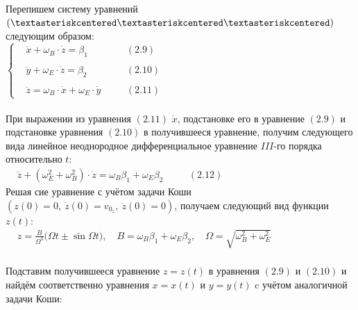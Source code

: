 \documentclass[oneside,final,14pt]{extarticle}
\begin{document}
	\noindent Перепишем систему уравнений $(\textasteriskcentered\textasteriskcentered\textasteriskcentered)$ следующим образом: \\
	
	\begin{math}
		\left\{
		\begin{aligned}
			& \ddot{x} + \omega_{B} \cdot \dot{z} = \beta_{1} \quad && (2.9) \\\\
			& \ddot{y} + \omega_{E} \cdot \dot{z} = \beta_{2} \quad && (2.10) \\\\
			& \ddot{z} = \omega_{B} \cdot \dot{x} + \omega_{E} \cdot \dot{y} \quad && (2.11)
		\end{aligned}
		\right.
	\end{math} \\\\
	
	\noindent При выражении из уравнения $(2.11)$ $\dot{x}$, подстановке его в уравнение $(2.9)$ и подстановке уравнения $(2.10)$ в получившееся уравнение, получим следующего вида линейное неоднородное дифференциальное уравнение $III$-го порядка относительно $t$: \\
	
	\begin{math}
		\begin{aligned}
			& \dddot{z} + (\omega_{E}^{2} + \omega_{B}^{2}) \cdot \dot{z} = \omega_{B}\beta_{1} + \omega_{E}\beta_{2} \quad && (2.12)
		\end{aligned}
	\end{math} \\
	
	\noindent Решая сие уравнение с учётом задачи Коши $(z(0) = 0,\ \dot{z}(0) = v_{0_{z}},\ \ddot{z}(0) = 0)$, получаем следующий вид функции $z(t)$: \\
	
	\begin{math}
		\begin{aligned}
			& z = \frac{B}{\Omega^{3}} \Big(\Omega t \pm \sin{\Omega t}\Big), \quad B = \omega_{B}\beta_{1} + \omega_{E}\beta_{2}, \quad \Omega = \sqrt{\omega_{B}^{2} + \omega_{E}^{2}} 
		\end{aligned}
	\end{math} \\\\
	
	\noindent Подставим получившееся уравнение $z = z(t)$ в уравнения $(2.9)$ и $(2.10)$ и найдём соответственно уравнения $x = x(t)$ и $y = y(t)$ c учётом аналогичной задачи Коши: \\
	
\end{document}
